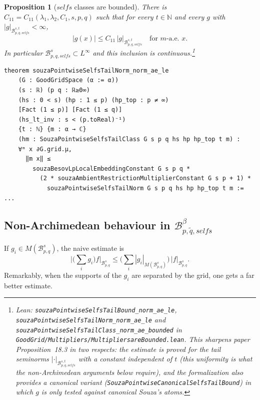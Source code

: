 \documentclass[11pt]{amsart}
\newtheorem{proposition}[theorem]{Proposition}
\theoremstyle{definition}
\newcommand{\lean}[1]{\texttt{#1}}
\begin{document}
\begin{proposition}[$selfs$ classes are bounded]\label{selfsbdd}
There is $C_{11}=C_{11}(\lambda_1,\lambda_2,C_1,s,p,q)$ such that for every
$t \in \mathbb{N}$ and every $g$ with
$|g|_{\mathcal{B}^{s,t}_{p,q,selfs}}<\infty$,
$$|g(x)| \leq C_{11}\, |g|_{\mathcal{B}^{s,t}_{p,q,selfs}}
\quad \text{for } m\text{-a.e. } x.$$
In particular $\mathcal{B}^s_{p,q,selfs} \subset L^\infty$ and this inclusion
is continuous.\footnote{Lean:
\lean{souzaPointwiseSelfsTailBound\_norm\_ae\_le},
\lean{souzaPointwiseSelfsTailNorm\_norm\_ae\_le} and
\lean{souzaPointwiseSelfsTailClass\_norm\_ae\_bounded} in
\lean{GoodGrid/Multipliers/MultipliersareBounded.lean}. This sharpens paper
Proposition~18.3 in two respects: the estimate is proved for the tail
seminorms $|\cdot|_{\mathcal{B}^{s,t}_{p,q,selfs}}$ with a constant
\emph{independent of $t$} (this uniformity is what the non-Archimedean
arguments below require), and the formalization also provides a
\emph{canonical} variant
(\lean{SouzaPointwiseCanonicalSelfsTailBound}) in which $g$ is only tested
against canonical Souza's atoms.}
\end{proposition}
\begin{lstlisting}[style=lean]
theorem souzaPointwiseSelfsTailNorm_norm_ae_le
    (G : GoodGridSpace (α := α))
    (s : ℝ) (p q : ℝ≥0∞)
    (hs : 0 < s) (hp : 1 ≤ p) (hp_top : p ≠ ∞)
    [Fact (1 ≤ p)] [Fact (1 ≤ q)]
    (hs_lt_inv : s < (p.toReal)⁻¹)
    {t : ℕ} {m : α → ℂ}
    (hm : SouzaPointwiseSelfsTailClass G s p q hs hp hp_top t m) :
    ∀ᵐ x ∂G.grid.μ,
      ‖m x‖ ≤
        souzaBesovLpLocalEmbeddingConstant G s p q *
          (2 * souzaAmbientRestrictionMultiplierConstant G s p + 1) *
            souzaPointwiseSelfsTailNorm G s p q hs hp hp_top t m := ...
\end{lstlisting}

\subsection{Non-Archimedean behaviour in $\mathcal{B}^\beta_{p,\tilde{q},selfs}$}

If $g_i \in M(\mathcal{B}^s_{p,q})$, the naive estimate is
$$\Big|\big(\sum_i g_i\big)f\Big|_{\mathcal{B}^s_{p,q}}\leq \Big(\sum_i
|g_i|_{M(\mathcal{B}^s_{p,q})}\Big)\,|f|_{\mathcal{B}^s_{p,q}}.$$
Remarkably, when the supports of the $g_i$ are separated by the grid, one
gets a far better estimate.
\end{document}
